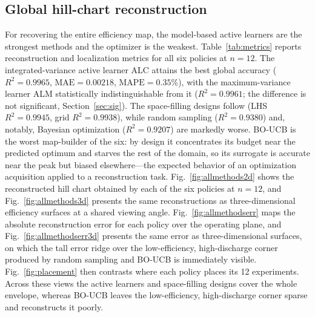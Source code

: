 \documentclass[preprint,12pt]{elsarticle}
\begin{document}
\subsection{Global hill-chart reconstruction}\label{sec:recon}
For recovering the entire efficiency map, the model-based active learners are the
strongest methods and the optimizer is the weakest. Table~\ref{tab:metrics} reports
reconstruction and localization metrics for all six policies at $n = 12$. The
integrated-variance active learner ALC attains the best global accuracy
($R^2 = 0.9965$, $\mathrm{MAE} = 0.00218$, $\mathrm{MAPE} = 0.35\%$), with the
maximum-variance learner ALM statistically indistinguishable from it ($R^2 = 0.9961$;
the difference is not significant, Section~\ref{sec:sig}). The space-filling designs
follow (LHS $R^2 = 0.9945$, grid $R^2 = 0.9938$), while random sampling
($R^2 = 0.9380$) and, notably, Bayesian optimization ($R^2 = 0.9207$) are markedly
worse. BO-UCB is the worst map-builder of the six: by design it concentrates its
budget near the predicted optimum and starves the rest of the domain, so its surrogate
is accurate near the peak but biased elsewhere---the expected behavior of an
optimization acquisition applied to a reconstruction task.
Fig.~\ref{fig:allmethods2d} shows the reconstructed hill chart obtained by each of the
six policies at $n = 12$, and Fig.~\ref{fig:allmethods3d} presents the same
reconstructions as three-dimensional efficiency surfaces at a shared viewing angle.
Fig.~\ref{fig:allmethodserr} maps the absolute reconstruction error for each policy
over the operating plane, and Fig.~\ref{fig:allmethodserr3d} presents the same error
as three-dimensional surfaces, on which the tall error ridge over the low-efficiency,
high-discharge corner produced by random sampling and BO-UCB is immediately visible.
Fig.~\ref{fig:placement} then contrasts where each policy places its 12 experiments.
Across these views the active learners and space-filling designs cover the whole
envelope, whereas BO-UCB leaves the low-efficiency, high-discharge corner sparse and
reconstructs it poorly.
\end{document}

